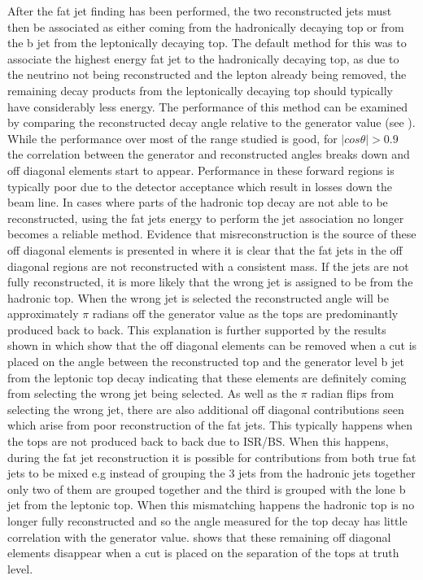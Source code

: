 After the fat jet finding has been performed, the two reconstructed jets must then be associated as either coming from the hadronically decaying top or from the b jet from the leptonically decaying top. The default method for this was to associate the highest energy fat jet to the hadronically decaying top, as due to the neutrino not being reconstructed and the lepton already being removed, the remaining decay products from the leptonically decaying top should typically have considerably less energy. The performance of this method can be examined by comparing the reconstructed decay angle relative to the generator value (see ). While the performance over most of the range studied is good, for $\mid cos\theta \mid>0.9$ the correlation between the generator and reconstructed angles breaks down and off diagonal elements start to appear. Performance in these forward regions is typically poor due to the detector acceptance which result in losses down the beam line. In cases where parts of the hadronic top decay are not able to be reconstructed, using the fat jets energy to perform the jet association no longer becomes a reliable method. Evidence that misreconstruction is the source of these off diagonal elements is presented in  where it is clear that the fat jets in the off diagonal regions are not reconstructed with a consistent mass. If the jets are not fully reconstructed, it is more likely that the wrong jet is assigned to be from the hadronic top. When the wrong jet is selected the reconstructed angle will be approximately $\pi$ radians off the generator value as the tops are predominantly produced back to back. This explanation is further supported by the results shown in  which show that the off diagonal elements can be removed when a cut is placed on the angle between the reconstructed top and the generator level b jet from the leptonic top decay indicating that these elements are definitely coming from selecting the wrong jet being selected. As well as the $\pi$ radian flips from selecting the wrong jet, there are also additional off diagonal contributions seen which arise from poor reconstruction of the fat jets. This typically happens when the tops are not produced back to back due to \ac{ISR}/\ac{BS}. When this happens, during the fat jet reconstruction it is possible for contributions from both true fat jets to be mixed e.g instead of grouping the 3 jets from the hadronic jets together only two of them are grouped together and the third is grouped with the lone b jet from the leptonic top. When this mismatching happens the hadronic top is no longer fully reconstructed and so the angle measured for the top decay has little correlation with the generator value.  shows that these remaining off diagonal elements disappear when a cut is placed on the separation of the tops at truth level. 

